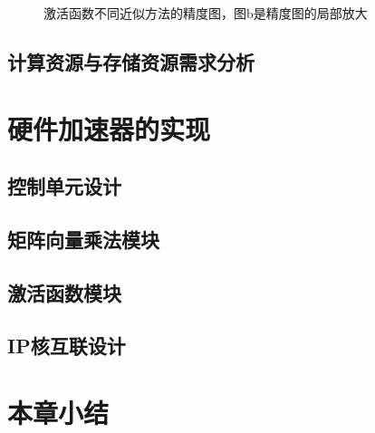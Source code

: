 \begin{figure}[htbp]
	\centering
	\label{fig:activationErr}
	\caption{激活函数不同近似方法的精度图，图b是精度图的局部放大}
\end{figure}
\subsection{计算资源与存储资源需求分析}

\section{硬件加速器的实现}
\subsection{控制单元设计}

\subsection{矩阵向量乘法模块}

\subsection{激活函数模块}

\subsection{IP核互联设计}

\section{本章小结}
